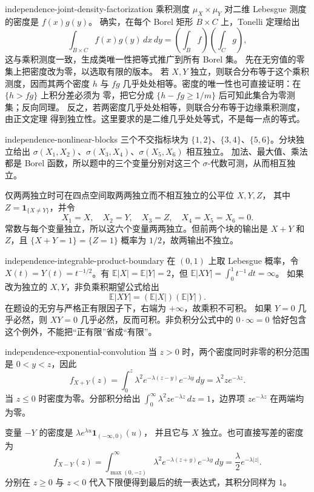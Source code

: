 \begin{solution}{independence-joint-density-factorization}
乘积测度 $\mu_X\times\mu_Y$ 对二维 Lebesgue 测度的密度是 $f(x)g(y)$。
确实，在每个 Borel 矩形 $B\times C$ 上，Tonelli 定理给出
\[
 \int_{B\times C}f(x)g(y)\,dx\,dy
 =\left(\int_Bf\right)\left(\int_Cg\right),
\]
这与乘积测度一致，生成类唯一性把等式推广到所有 Borel 集。
先在无穷值的零集上把密度改为零，以选取有限的版本。
若 $X,Y$ 独立，则联合分布等于这个乘积测度，因而其两个密度 $h$ 与 $fg$
几乎处处相等。密度的唯一性也可直接证明：在 $\{h>fg\}$ 上积分差必须为
零，把它分成 $\{h-fg\ge1/m\}$ 后可知此集合为零测集；反向同理。
反之，若两密度几乎处处相等，则联合分布等于边缘乘积测度，由正文定理
得到独立性。这里要求的是二维几乎处处等式，不是每一点的等式。
\end{solution}

\begin{solution}{independence-nonlinear-blocks}
三个不交指标块为 $\{1,2\}$、$\{3,4\}$、$\{5,6\}$。分块独立给出
$\sigma(X_1,X_2)$、$\sigma(X_3,X_4)$、$\sigma(X_5,X_6)$ 相互独立。
加法、最大值、乘法都是 Borel 函数，所以题中的三个变量分别对这三个
$\sigma$-代数可测，从而相互独立。

仅两两独立时可在四点空间取两两独立而不相互独立的公平位 $X,Y,Z$，
其中 $Z=\mathbf 1_{\{X\ne Y\}}$，并令
\[
 X_1=X,\quad X_2=Y,\quad X_3=Z,\quad X_4=X_5=X_6=0.
\]
常数与每个变量独立，所以这六个变量两两独立。但前两个块的输出是
$X+Y$ 和 $Z$，且 $\{X+Y=1\}=\{Z=1\}$ 概率为 $1/2$，故两输出不独立。
\end{solution}

\begin{solution}{independence-integrable-product-boundary}
在 $(0,1)$ 上取 Lebesgue 概率，令 $X(t)=Y(t)=t^{-1/2}$。有
$\mathbb E|X|=\mathbb E|Y|=2$，但
$\mathbb E|XY|=\int_0^1t^{-1}\,dt=\infty$。
如果改为独立的 $X,Y$，非负乘积期望公式给出
\[
 \mathbb E|XY|=(\mathbb E|X|)(\mathbb E|Y|).
\]
在题设的无穷与严格正有限因子下，右端为 $+\infty$，故乘积不可积。
如果 $Y=0$ 几乎必然，则 $XY=0$ 几乎必然，反而可积。非负积分公式中的
$0\cdot\infty=0$ 恰好包含这个例外，不能把“正有限”省成“有限”。
\end{solution}

\begin{solution}{independence-exponential-convolution}
当 $z>0$ 时，两个密度同时非零的积分范围是 $0<y<z$，因此
\[
 f_{X+Y}(z)=\int_0^z\lambda^2e^{-\lambda(z-y)}e^{-\lambda y}\,dy
 =\lambda^2ze^{-\lambda z}.
\]
当 $z\le0$ 时密度为零。分部积分给出
$\int_0^\infty\lambda^2ze^{-\lambda z}\,dz=1$，边界项
$ze^{-\lambda z}$ 在两端均为零。

变量 $-Y$ 的密度是 $\lambda e^{\lambda u}\mathbf 1_{(-\infty,0)}(u)$，
并且它与 $X$ 独立。也可直接写差的密度为
\[
 f_{X-Y}(z)=\int_{\max(0,-z)}^\infty
       \lambda^2e^{-\lambda(z+y)}e^{-\lambda y}\,dy
 =\frac\lambda2e^{-\lambda|z|}.
\]
分别在 $z\ge0$ 与 $z<0$ 代入下限便得到最后的统一表达式，其积分同样为 $1$。
\end{solution}

